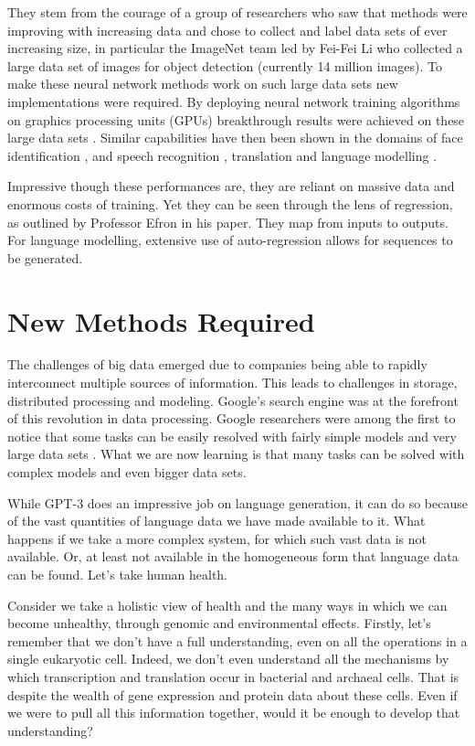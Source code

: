 \documentclass[a4paperpaper,]{article}
\begin{document}
They stem from the courage of a group of researchers who saw that
methods were improving with increasing data and chose to collect and
label data sets of ever increasing size, in particular the ImageNet team
led by Fei-Fei Li \citep{Russakovsky-imagenet15} who collected a large
data set of images for object detection (currently 14 million images).
To make these neural network methods work on such large data sets new
implementations were required. By deploying neural network training
algorithms on graphics processing units (GPUs) breakthrough results were
achieved on these large data sets \citep{Krizhevsky:imagenet12}. Similar
capabilities have then been shown in the domains of face identification
\citep{Taigman:deepface14}, and speech recognition
\citep{Hinton:acoustic12}, translation \citep{Sutskever:sequence14} and
language modelling \citep{Radford:language19, Devlin:bert19}.

Impressive though these performances are, they are reliant on massive
data and enormous costs of training. Yet they can be seen through the
lens of regression, as outlined by Professor Efron in his paper. They
map from inputs to outputs. For language modelling, extensive use of
auto-regression allows for sequences to be generated.

\hypertarget{new-methods-required}{%
\section{New Methods Required}\label{new-methods-required}}


The challenges of big data emerged due to companies being able to
rapidly interconnect multiple sources of information. This leads to
challenges in storage, distributed processing and modeling. Google's
search engine was at the forefront of this revolution in data
processing. Google researchers were among the first to notice that some
tasks can be easily resolved with fairly simple models and very large
data sets \citep{Halevy:unreasonable09}. What we are now learning is
that many tasks can be solved with complex models and even bigger data
sets.

While GPT-3 does an impressive job on language generation, it can do so
because of the vast quantities of language data we have made available
to it. What happens if we take a more complex system, for which such
vast data is not available. Or, at least not available in the
homogeneous form that language data can be found. Let's take human
health.

Consider we take a holistic view of health and the many ways in which we
can become unhealthy, through genomic and environmental effects.
Firstly, let's remember that we don't have a full understanding, even on
all the operations in a single eukaryotic cell. Indeed, we don't even
understand all the mechanisms by which transcription and translation
occur in bacterial and archaeal cells. That is despite the wealth of
gene expression and protein data about these cells. Even if we were to
pull all this information together, would it be enough to develop that
understanding?
\end{document}
